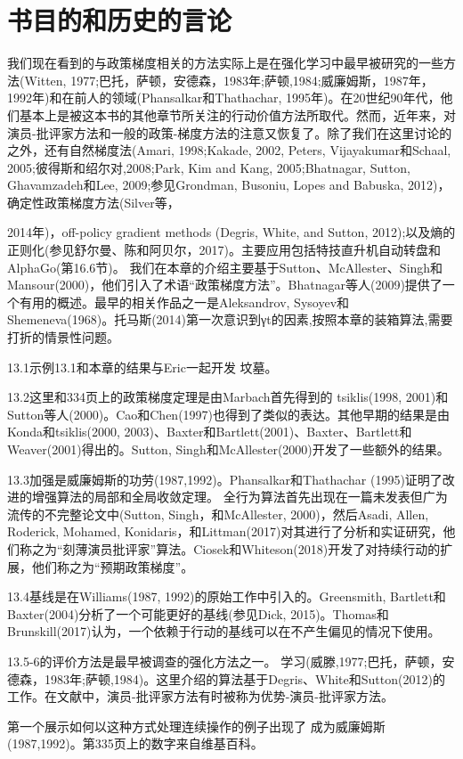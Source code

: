 \section{书目的和历史的言论}

我们现在看到的与政策梯度相关的方法实际上是在强化学习中最早被研究的一些方法(Witten, 1977;巴托，萨顿，安德森，1983年;萨顿,1984;威廉姆斯，1987年，1992年)和在前人的领域(Phansalkar和Thathachar, 1995年)。在20世纪90年代，他们基本上是被这本书的其他章节所关注的行动价值方法所取代。然而，近年来，对演员-批评家方法和一般的政策-梯度方法的注意又恢复了。除了我们在这里讨论的之外，还有自然梯度法(Amari, 1998;Kakade, 2002, Peters, Vijayakumar和Schaal, 2005;彼得斯和绍尔对,2008;Park, Kim and Kang, 2005;Bhatnagar, Sutton, Ghavamzadeh和Lee, 2009;参见Grondman, Busoniu, Lopes and Babuska, 2012)，确定性政策梯度方法(Silver等，

2014年)，off-policy gradient methods (Degris, White, and Sutton, 2012);以及熵的正则化(参见舒尔曼、陈和阿贝尔，2017)。主要应用包括特技直升机自动转盘和AlphaGo(第16.6节)。
我们在本章的介绍主要基于Sutton、McAllester、Singh和Mansour(2000)，他们引入了术语“政策梯度方法”。Bhatnagar等人(2009)提供了一个有用的概述。最早的相关作品之一是Aleksandrov, Sysoyev和Shemeneva(1968)。托马斯(2014)第一次意识到γt的因素,按照本章的装箱算法,需要打折的情景性问题。

13.1示例13.1和本章的结果与Eric一起开发
坟墓。

13.2这里和334页上的政策梯度定理是由Marbach首先得到的
tsiklis(1998, 2001)和Sutton等人(2000)。Cao和Chen(1997)也得到了类似的表达。其他早期的结果是由Konda和tsiklis(2000, 2003)、Baxter和Bartlett(2001)、Baxter、Bartlett和Weaver(2001)得出的。Sutton, Singh和McAllester(2000)开发了一些额外的结果。

13.3加强是威廉姆斯的功劳(1987,1992)。Phansalkar和Thathachar
(1995)证明了改进的增强算法的局部和全局收敛定理。
全行为算法首先出现在一篇未发表但广为流传的不完整论文中(Sutton, Singh，和McAllester, 2000)，然后Asadi, Allen, Roderick, Mohamed, Konidaris，和Littman(2017)对其进行了分析和实证研究，他们称之为“刻薄演员批评家”算法。Ciosek和Whiteson(2018)开发了对持续行动的扩展，他们称之为“预期政策梯度”。

13.4基线是在Williams(1987, 1992)的原始工作中引入的。Greensmith,
Bartlett和Baxter(2004)分析了一个可能更好的基线(参见Dick, 2015)。Thomas和Brunskill(2017)认为，一个依赖于行动的基线可以在不产生偏见的情况下使用。

13.5-6的评价方法是最早被调查的强化方法之一。
学习(威滕,1977;巴托，萨顿，安德森，1983年;萨顿,1984)。这里介绍的算法基于Degris、White和Sutton(2012)的工作。在文献中，演员-批评家方法有时被称为优势-演员-批评家方法。

第一个展示如何以这种方式处理连续操作的例子出现了
成为威廉姆斯(1987,1992)。第335页上的数字来自维基百科。

 
